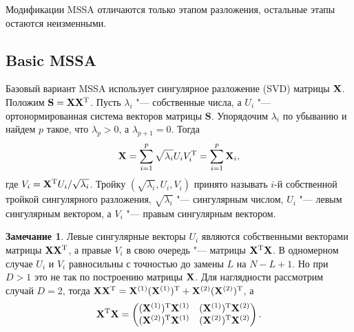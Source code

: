 \documentclass[specialist,
substylefile = spbu_report.rtx,
subf,href,colorlinks=true, 12pt]{disser}
\theoremstyle{definition}
\newtheorem{remark}{Замечание}
\begin{document}
Модификации MSSA отличаются только этапом разложения, остальные этапы остаются неизменными.
\subsection{Basic MSSA}\label{sect:basic_mssa}
Базовый вариант MSSA использует сингулярное разложение (SVD) матрицы $\mathbf{X}$. Положим $\mathbf{S}=\mathbf{X}\mathbf{X}^{\mathrm{T}}$. Пусть $\lambda_i$ "--- собственные числа, а $U_i$ "--- ортонормированная система векторов матрицы $\mathbf{S}$. Упорядочим $\lambda_i$ по убыванию и найдем $p$ такое, что $\lambda_p>0$, а $\lambda_{p+1}=0$. Тогда
\begin{equation}\label{eq:svd}
	\mathbf{X}=\sum_{i=1}^p\sqrt{\lambda_i}U_iV_i^{\mathrm{T}}=\sum_{i=1}^p\mathbf{X}_i,
\end{equation}
где $V_i=\mathbf{X}^{\mathrm{T}} U_i/\sqrt{\lambda_i}$. Тройку $(\sqrt{\lambda_i}, U_i, V_i)$ принято называть $i$-й собственной тройкой сингулярного разложения, $\sqrt{\lambda_i}$ "--- сингулярным числом, $U_i$ "--- левым сингулярным вектором, а $V_i$ "--- правым сингулярным вектором.

\begin{remark}\label{remark:svd}
	Левые сингулярные векторы $U_i$ являются собственными векторами матрицы $\mathbf{X}\mathbf{X}^{\mathrm{T}}$, а правые $V_i$ в свою очередь "--- матрицы $\mathbf{X}^{\mathrm{T}}\mathbf{X}$. В одномерном случае $U_i$ и $V_i$ равносильны с точностью до замены $L$ на $N-L+1$. Но при $D>1$ это не так по построению матрицы $\mathbf{X}$. Для наглядности рассмотрим случай $D=2$, тогда $\mathbf{X}\mathbf{X}^{\mathrm{T}}=\mathbf{X}^{(1)}(\mathbf{X}^{(1)})^{\mathrm{T}} + \mathbf{X}^{(2)}(\mathbf{X}^{(2)})^{\mathrm{T}}$, а
	\[
		\mathbf{X}^{\mathrm{T}}\mathbf{X}=
		\begin{pmatrix}
			(\mathbf{X}^{(1)})^{\mathrm{T}}\mathbf{X}^{(1)} & (\mathbf{X}^{(1)})^{\mathrm{T}}\mathbf{X}^{(2)} \\
			(\mathbf{X}^{(2)})^{\mathrm{T}}\mathbf{X}^{(1)} & (\mathbf{X}^{(2)})^{\mathrm{T}}\mathbf{X}^{(2)}
		\end{pmatrix}.
	\]
\end{remark}
\end{document}

